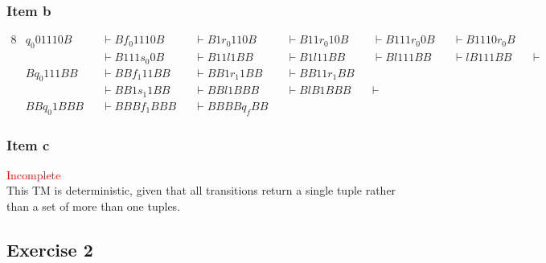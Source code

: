 {\begin{center}
\end{center}
\subsubsection{Item b}
\begin{alignat*}{8}
	& q_0 01110B  &&\vdash B f_0 1110B &&\vdash B1 r_0 110B &&\vdash B11 r_0 10B &&\vdash B111 r_0 0B &&\vdash B1110 r_0 B &&\\
	&             &&\vdash B111 s_0 0B &&\vdash B11 l 1BB   &&\vdash B1 l 11BB   &&\vdash B l 111BB   &&\vdash l B111BB    &&\vdash \\
	& B q_0 111BB &&\vdash BB f_1 11BB &&\vdash BB1 r_1 1BB &&\vdash BB11 r_1 BB \\
	&			  &&\vdash BB1 s_1 1BB &&\vdash BB l 1BBB   &&\vdash B l B1BBB   &&\vdash\\
	& BB q_0 1BBB &&\vdash BBB f_1 BBB &&\vdash BBBB q_f BB 
\end{alignat*}
\subsubsection{Item c}
\textcolor{red}{Incomplete}\\
This TM is deterministic, given that all transitions return a single tuple rather than a set of more than one tuples.
\subsection{Exercise 2}
}
